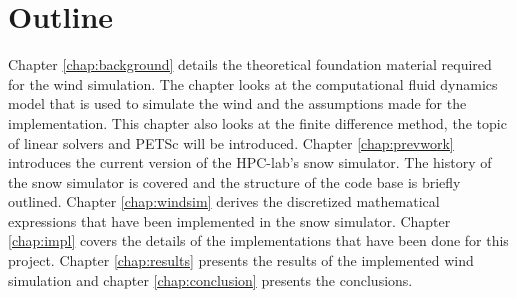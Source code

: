 \section{Outline}

Chapter \ref{chap:background} details the theoretical foundation material required for the wind
simulation. The chapter looks at the computational fluid dynamics model that is
used to simulate the wind and the assumptions made for the implementation. This
chapter also looks at the finite difference method, the topic of linear solvers
and PETSc will be introduced. Chapter \ref{chap:prevwork} introduces the current version of the
HPC-lab's snow simulator. The history of the snow simulator is covered and the
structure of the code base is briefly outlined. Chapter \ref{chap:windsim} derives the
discretized mathematical expressions that have been implemented in the snow
simulator. Chapter \ref{chap:impl} covers the details of the implementations that have been
done for this project. Chapter \ref{chap:results} presents the results of the implemented wind
simulation and chapter \ref{chap:conclusion} presents the conclusions.
